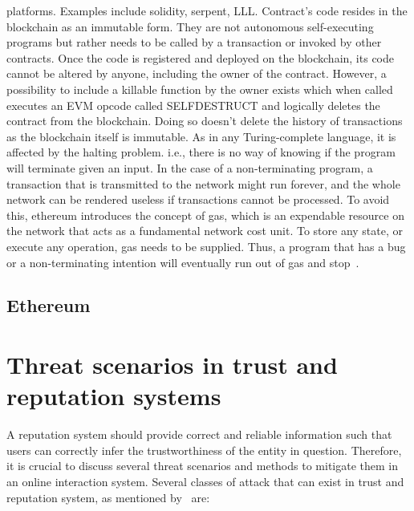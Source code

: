 platforms. Examples include solidity, serpent, LLL.  Contract's code resides in
the blockchain as an immutable form.  They are not autonomous self-executing
programs but rather needs to be called by a transaction or invoked by other
contracts. Once the code is registered and deployed on the blockchain, its code
cannot be altered by anyone, including the owner of the contract. However, a
possibility to include a killable function by the owner exists which when
called executes an EVM opcode called SELFDESTRUCT and logically deletes the
contract from the blockchain. Doing so doesn't delete the history of
transactions as the blockchain itself is immutable. As in any Turing-complete
language, it is affected by the halting problem. i.e., there is no way of
knowing if the program will terminate given an input. In the case of a
non-terminating program, a transaction that is transmitted to the network might
run forever, and the whole network can be rendered useless if transactions
cannot be processed. To avoid this, ethereum introduces the concept of gas,
which is an expendable resource on the network that acts as a fundamental
network cost unit. To store any state, or execute any operation, gas needs to
be supplied. Thus, a program that has a bug or a non-terminating intention will
eventually run out of gas and stop~\cite{whataresmartcontracts}. 
\subsection{Ethereum}

\section{Threat scenarios in trust and reputation systems}
A reputation system should provide correct and reliable information such that
users can correctly infer the trustworthiness of the entity in question.
Therefore, it is crucial to discuss several threat scenarios and methods to
mitigate them in an online interaction system. Several classes of attack that
can exist in trust and reputation system, as mentioned
by~\cite{hoffman2009survey,marmol2009security} are:  
